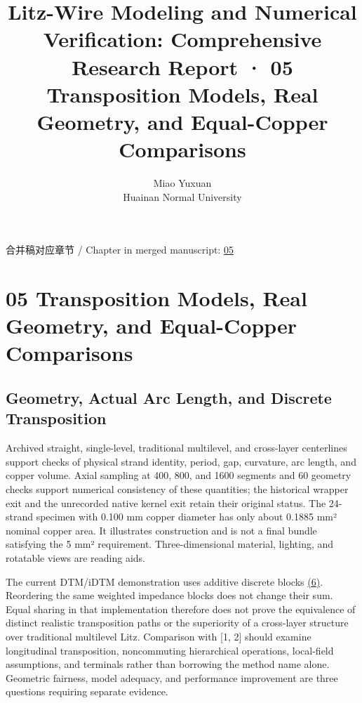 \documentclass[11pt]{article}
\begin{document}
\title{Litz-Wire Modeling and Numerical Verification: Comprehensive Research Report · 05 Transposition Models, Real Geometry, and Equal-Copper Comparisons}
\author{Miao Yuxuan\\Huainan Normal University}
\date{}
\maketitle
\noindent 合并稿对应章节 / Chapter in merged manuscript: \href{report_en_single.pdf#chapter-05}{05}\par
\FloatBarrier
\section*{05 Transposition Models, Real Geometry, and Equal-Copper Comparisons}
\hypertarget{chapter-05}{}
\subsection*{Geometry, Actual Arc Length, and Discrete Transposition}
\hypertarget{05.geometry.heading}{}
Archived straight, single-level, traditional multilevel, and cross-layer centerlines support checks of physical strand identity, period, gap, curvature, arc length, and copper volume. Axial sampling at 400, 800, and 1600 segments and 60 geometry checks support numerical consistency of these quantities; the historical wrapper exit and the unrecorded native kernel exit retain their original status. The 24-strand specimen with 0.100 mm copper diameter has only about 0.1885 mm² nominal copper area. It illustrates construction and is not a final bundle satisfying the 5 mm² requirement. Three-dimensional material, lighting, and rotatable views are reading aids.


The current DTM/iDTM demonstration uses additive discrete blocks \href{report_en_single.pdf#E06}{(6)}. Reordering the same weighted impedance blocks does not change their sum. Equal sharing in that implementation therefore does not prove the equivalence of distinct realistic transposition paths or the superiority of a cross-layer structure over traditional multilevel Litz. Comparison with [1, 2] should examine longitudinal transposition, noncommuting hierarchical operations, local-field assumptions, and terminals rather than borrowing the method name alone. Geometric fairness, model adequacy, and performance improvement are three questions requiring separate evidence.
\end{document}
